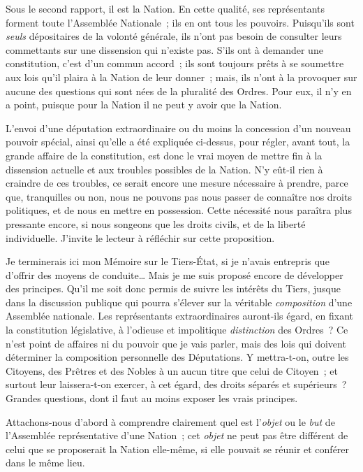 \documentclass[french,twoside]{book} %
\begin{document}
Sous le second rapport, il est la Nation. En cette qualité, ses représentants forment toute l’Assemblée Nationale ; ils en ont tous les pouvoirs. Puisqu’ils sont {\itshape seuls} dépositaires de la volonté générale, ils n’ont pas besoin de consulter leurs commettants sur une dissension qui n’existe pas. S’ils ont à demander une constitution, c’est d’un commun accord ; ils sont toujours prêts à se soumettre aux lois qu’il plaira à la Nation de leur donner ; mais, ils n’ont à la provoquer sur aucune des questions qui sont nées de la pluralité des Ordres. Pour eux, il n’y en a point, puisque pour la Nation il ne peut y avoir que la Nation.\par
L’envoi d’une députation extraordinaire ou du moins la concession d’un nouveau pouvoir spécial, ainsi qu’elle a été expliquée ci-dessus, pour régler, avant tout, la grande affaire de la constitution, est donc le vrai moyen de mettre fin à la dissension actuelle et aux troubles possibles de la Nation. N’y eût-il rien à craindre de ces troubles, ce serait encore une mesure nécessaire à prendre, parce que, tranquilles ou non, nous ne pouvons pas nous passer de connaître nos droits politiques, et de nous en mettre en possession. Cette nécessité nous paraîtra plus pressante encore, si nous songeons que les droits civils, et de la liberté individuelle. J’invite le lecteur à réfléchir sur cette proposition.\par
Je terminerais ici mon Mémoire sur le Tiers-État, si je n’avais entrepris que d’offrir des moyens de conduite… Mais je me suis proposé encore de développer des principes. Qu’il me soit donc permis de suivre les intérêts du Tiers, jusque dans la discussion publique qui pourra s’élever sur la véritable {\itshape composition} d’une Assemblée nationale. Les représentants extraordinaires auront-ils égard, en fixant la constitution législative, à l’odieuse et impolitique {\itshape distinction} des Ordres ? Ce n’est point de affaires ni du pouvoir que je vais parler, mais des lois qui doivent déterminer la composition personnelle des Députations. Y mettra-t-on, outre les Citoyens, des Prêtres et des Nobles à un aucun titre que celui de Citoyen ; et surtout leur laissera-t-on exercer, à cet égard, des droits séparés et supérieurs ? Grandes questions, dont il faut au moins exposer les vrais principes.\par
Attachons-nous d’abord à comprendre clairement quel est l’{\itshape objet} ou le {\itshape but} de l’Assemblée représentative d’une Nation ; cet {\itshape objet} ne peut pas être différent de celui que se proposerait la Nation elle-même, si elle pouvait se réunir et conférer dans le même lieu.\par
\end{document}
